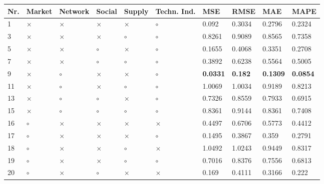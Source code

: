 \begin{table}[H]
\centering
\begin{tabular}{|P{0.7cm}|P{1.3cm}P{1.3cm}P{1.3cm}P{1.3cm}P{1.3cm}|P{1.1cm}P{1.1cm}P{1.1cm}P{1.1cm}|}
\hline
 Nr. &   Market &  Network &   Social &   Supply & Techn. Ind. &             MSE &           RMSE &             MAE &            MAPE \\
 & $\times$ & $\times$ & $\times$ & $\times$ &     $\circ$ &           0.092 &         0.3034 &          0.2796 &          0.2324 \\
   3 & $\times$ & $\times$ & $\times$ &  $\circ$ &     $\circ$ &          0.8261 &         0.9089 &          0.8565 &          0.7358 \\
   5 & $\times$ & $\times$ &  $\circ$ & $\times$ &     $\circ$ &          0.1655 &         0.4068 &          0.3351 &          0.2708 \\
   7 & $\times$ & $\times$ &  $\circ$ &  $\circ$ &     $\circ$ &          0.3892 &         0.6238 &          0.5564 &          0.5005 \\
   9 & $\times$ &  $\circ$ & $\times$ & $\times$ &     $\circ$ & \textbf{0.0331} & \textbf{0.182} & \textbf{0.1309} & \textbf{0.0854} \\
  11 & $\times$ &  $\circ$ & $\times$ &  $\circ$ &     $\circ$ &          1.0069 &         1.0034 &          0.9189 &          0.8213 \\
  13 & $\times$ &  $\circ$ &  $\circ$ & $\times$ &     $\circ$ &          0.7326 &         0.8559 &          0.7933 &          0.6915 \\
  15 & $\times$ &  $\circ$ &  $\circ$ &  $\circ$ &     $\circ$ &          0.8361 &         0.9144 &          0.8361 &          0.7408 \\
  16 &  $\circ$ & $\times$ & $\times$ & $\times$ &    $\times$ &          0.4497 &         0.6706 &          0.5773 &          0.4412 \\
  17 &  $\circ$ & $\times$ & $\times$ & $\times$ &     $\circ$ &          0.1495 &         0.3867 &           0.359 &          0.2791 \\
  18 &  $\circ$ & $\times$ & $\times$ &  $\circ$ &    $\times$ &          1.0492 &         1.0243 &          0.9449 &          0.8317 \\
  19 &  $\circ$ & $\times$ & $\times$ &  $\circ$ &     $\circ$ &          0.7016 &         0.8376 &          0.7556 &          0.6813 \\
  20 &  $\circ$ & $\times$ &  $\circ$ & $\times$ &    $\times$ &           0.169 &         0.4111 &          0.3166 &           0.222 \\

\end{tabular}
\end{table}

